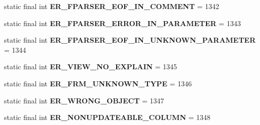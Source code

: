 \begin{DoxyCompactItemize}
static final int {\bfseries E\+R\+\_\+\+F\+P\+A\+R\+S\+E\+R\+\_\+\+E\+O\+F\+\_\+\+I\+N\+\_\+\+C\+O\+M\+M\+E\+NT} = 1342
\item 
\mbox{\label{classcom_1_1mysql_1_1cj_1_1exceptions_1_1_mysql_error_numbers_a97a17e2b8d80d46069d3f5f548dc178f}} 
static final int {\bfseries E\+R\+\_\+\+F\+P\+A\+R\+S\+E\+R\+\_\+\+E\+R\+R\+O\+R\+\_\+\+I\+N\+\_\+\+P\+A\+R\+A\+M\+E\+T\+ER} = 1343
\item 
\mbox{\label{classcom_1_1mysql_1_1cj_1_1exceptions_1_1_mysql_error_numbers_afcef6d3000cb657fd4b2f3335b2ea186}} 
static final int {\bfseries E\+R\+\_\+\+F\+P\+A\+R\+S\+E\+R\+\_\+\+E\+O\+F\+\_\+\+I\+N\+\_\+\+U\+N\+K\+N\+O\+W\+N\+\_\+\+P\+A\+R\+A\+M\+E\+T\+ER} = 1344
\item 
\mbox{\label{classcom_1_1mysql_1_1cj_1_1exceptions_1_1_mysql_error_numbers_a6d1e3351d6d2f7820152f601d6d06485}} 
static final int {\bfseries E\+R\+\_\+\+V\+I\+E\+W\+\_\+\+N\+O\+\_\+\+E\+X\+P\+L\+A\+IN} = 1345
\item 
\mbox{\label{classcom_1_1mysql_1_1cj_1_1exceptions_1_1_mysql_error_numbers_a819e6d15fa751bdb26a8a539a2792431}} 
static final int {\bfseries E\+R\+\_\+\+F\+R\+M\+\_\+\+U\+N\+K\+N\+O\+W\+N\+\_\+\+T\+Y\+PE} = 1346
\item 
\mbox{\label{classcom_1_1mysql_1_1cj_1_1exceptions_1_1_mysql_error_numbers_aadf8dd41dd6eafc6bee7c381a93d7e3b}} 
static final int {\bfseries E\+R\+\_\+\+W\+R\+O\+N\+G\+\_\+\+O\+B\+J\+E\+CT} = 1347
\item 
\mbox{\label{classcom_1_1mysql_1_1cj_1_1exceptions_1_1_mysql_error_numbers_ac1068646cb8035dbada8e55e06d76ce6}} 
static final int {\bfseries E\+R\+\_\+\+N\+O\+N\+U\+P\+D\+A\+T\+E\+A\+B\+L\+E\+\_\+\+C\+O\+L\+U\+MN} = 1348
\item 
\mbox{\label{classcom_1_1mysql_1_1cj_1_1exceptions_1_1_mysql_error_numbers_a028cd7bb4a6130e60291051220780ea6}} 

\end{DoxyCompactItemize}
